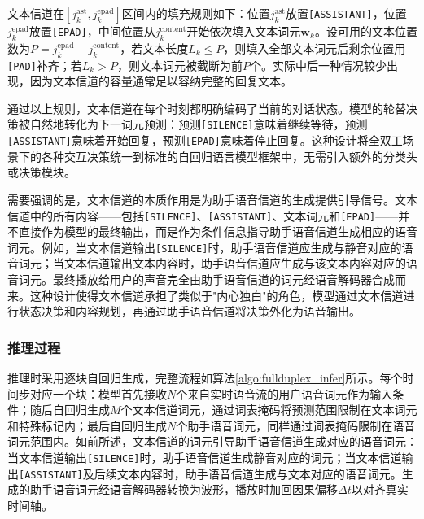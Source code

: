 文本信道在$[j_k^{\text{ast}}, j_k^{\text{epad}}]$区间内的填充规则如下：位置$j_k^{\text{ast}}$放置\texttt{[ASSISTANT]}，位置$j_k^{\text{epad}}$放置\texttt{[EPAD]}，中间位置从$j_k^{\text{content}}$开始依次填入文本词元$\mathbf{w}_k$。设可用的文本位置数为$P = j_k^{\text{epad}} - j_k^{\text{content}}$，若文本长度$L_k \leq P$，则填入全部文本词元后剩余位置用\texttt{[PAD]}补齐；若$L_k > P$，则文本词元被截断为前$P$个。实际中后一种情况较少出现，因为文本信道的容量通常足以容纳完整的回复文本。

通过以上规则，文本信道在每个时刻都明确编码了当前的对话状态。模型的轮替决策被自然地转化为下一词元预测：预测\texttt{[SILENCE]}意味着继续等待，预测\texttt{[ASSISTANT]}意味着开始回复，预测\texttt{[EPAD]}意味着停止回复。这种设计将全双工场景下的各种交互决策统一到标准的自回归语言模型框架中，无需引入额外的分类头或决策模块。

需要强调的是，文本信道的本质作用是为助手语音信道的生成提供引导信号。文本信道中的所有内容——包括\texttt{[SILENCE]}、\texttt{[ASSISTANT]}、文本词元和\texttt{[EPAD]}——并不直接作为模型的最终输出，而是作为条件信息指导助手语音信道生成相应的语音词元。例如，当文本信道输出\texttt{[SILENCE]}时，助手语音信道应生成与静音对应的语音词元；当文本信道输出文本内容时，助手语音信道应生成与该文本内容对应的语音词元。最终播放给用户的声音完全由助手语音信道的词元经语音解码器合成而来。这种设计使得文本信道承担了类似于"内心独白"的角色，模型通过文本信道进行状态决策和内容规划，再通过助手语音信道将决策外化为语音输出。

\subsubsection{推理过程}

推理时采用逐块自回归生成，完整流程如算法\ref{algo:fullduplex_infer}所示。每个时间步对应一个块：模型首先接收$N$个来自实时语音流的用户语音词元作为输入条件；随后自回归生成$M$个文本信道词元，通过词表掩码将预测范围限制在文本词元和特殊标记内；最后自回归生成$N$个助手语音词元，同样通过词表掩码限制在语音词元范围内。如前所述，文本信道的词元引导助手语音信道生成对应的语音词元：当文本信道输出\texttt{[SILENCE]}时，助手语音信道生成静音对应的词元；当文本信道输出\texttt{[ASSISTANT]}及后续文本内容时，助手语音信道生成与文本对应的语音词元。生成的助手语音词元经语音解码器转换为波形，播放时加回因果偏移$\Delta t$以对齐真实时间轴。

